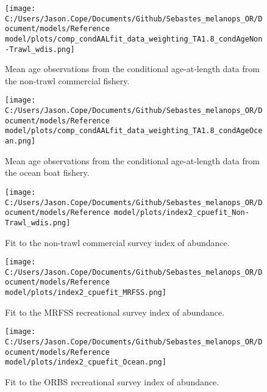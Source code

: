 \documentclass[11pt,
  english,
  letterpaper,
]{article}
\begin{document}
\newpage

\begin{figure}
\centering
\texttt{[image: C:/Users/Jason.Cope/Documents/Github/Sebastes\_melanops\_OR/Document/models/Reference model/plots/comp\_condAALfit\_data\_weighting\_TA1.8\_condAgeNon-Trawl\_wdis.png]}
\caption{Mean age observations from the conditional age-at-length data from the non-trawl commercial fishery.\label{fig:nontrawl-mean-caal}}
\end{figure}

\newpage

\begin{figure}
\centering
\texttt{[image: C:/Users/Jason.Cope/Documents/Github/Sebastes\_melanops\_OR/Document/models/Reference model/plots/comp\_condAALfit\_data\_weighting\_TA1.8\_condAgeOcean.png]}
\caption{Mean age observations from the conditional age-at-length data from the ocean boat fishery.\label{fig:ocean-mean-caal}}
\end{figure}

\newpage

\begin{figure}
\centering
\texttt{[image: C:/Users/Jason.Cope/Documents/Github/Sebastes\_melanops\_OR/Document/models/Reference model/plots/index2\_cpuefit\_Non-Trawl\_wdis.png]}
\caption{Fit to the non-trawl commercial survey index of abundance.\label{fig:nontrawl-index-fit}}
\end{figure}

\newpage

\begin{figure}
\centering
\texttt{[image: C:/Users/Jason.Cope/Documents/Github/Sebastes\_melanops\_OR/Document/models/Reference model/plots/index2\_cpuefit\_MRFSS.png]}
\caption{Fit to the MRFSS recreational survey index of abundance.\label{fig:mrfss-index-fit}}
\end{figure}

\newpage

\begin{figure}
\centering
\texttt{[image: C:/Users/Jason.Cope/Documents/Github/Sebastes\_melanops\_OR/Document/models/Reference model/plots/index2\_cpuefit\_Ocean.png]}
\caption{Fit to the ORBS recreational survey index of abundance.\label{fig:orbs-index-fit}}
\end{figure}

\newpage
\end{document}
